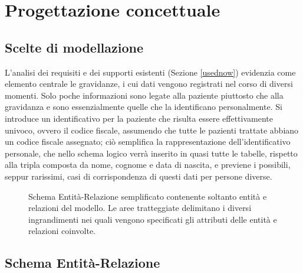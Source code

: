 \chapter{Progettazione concettuale}

\section{Scelte di modellazione}

L'analisi dei requisiti e dei supporti esistenti (Sezione \ref{usednow}) evidenzia come elemento centrale le gravidanze, i cui dati vengono registrati nel corso di diversi momenti.
Solo poche informazioni sono legate alla paziente piuttosto che alla gravidanza e sono essenzialmente quelle che la identificano personalmente.
Si introduce un identificativo per la paziente che risulta essere effettivamente univoco, ovvero il codice fiscale, assumendo che tutte le pazienti trattate abbiano un codice fiscale assegnato; ciò semplifica la rappresentazione dell'identificativo personale, che nello schema logico verrà inserito in quasi tutte le tabelle, rispetto alla tripla composta da nome, cognome e data di nascita, e previene i possibili, seppur rarissimi, casi di corrispondenza di questi dati per persone diverse.

\begin{figure}

\caption{Schema Entità-Relazione semplificato contenente soltanto entità e relazioni del modello. Le aree tratteggiate delimitano i diversi ingrandimenti nei quali vengono specificati gli attributi delle entità e relazioni coinvolte.}
\label{completeerdiagram}
\end{figure}

\section{Schema Entità-Relazione}